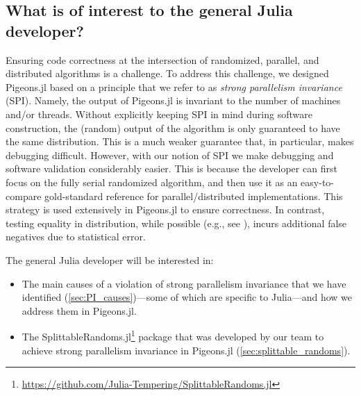 \subsection{What is of interest to the general Julia developer?}
Ensuring code correctness at the intersection of randomized, parallel, and 
distributed algorithms is a challenge. To address this challenge, we designed Pigeons.jl 
based on a principle that we refer to as \textit{strong parallelism invariance}
(SPI).
Namely, the output of Pigeons.jl is  invariant to the number of machines 
and/or threads.
Without explicitly keeping SPI in mind during software construction, 
the (random) output of the algorithm is only guaranteed to have the same distribution.
This is a much weaker guarantee that, in particular, makes debugging difficult.
However, with our notion of SPI we make debugging and 
software validation considerably easier. This is because the developer can 
first focus on the fully serial randomized algorithm, and then use it as an 
easy-to-compare gold-standard reference for parallel/distributed implementations. 
This strategy is used extensively in Pigeons.jl to ensure correctness. In contrast, 
testing equality in distribution, while possible (e.g., see \cite{geweke2004getting}), 
incurs additional false negatives due to statistical error.

 
The general Julia developer will be interested in: 
\begin{itemize}
    \item The main causes of a violation of strong parallelism invariance that we have identified 
    (\cref{sec:PI_causes})---some of which are specific to Julia---and how we address 
    them in Pigeons.jl.

    \item The SplittableRandoms.jl\footnote{\url{https://github.com/Julia-Tempering/SplittableRandoms.jl}}
    package that was developed by our team 
    to achieve strong parallelism invariance in Pigeons.jl (\cref{sec:splittable_randoms}).
\end{itemize}
